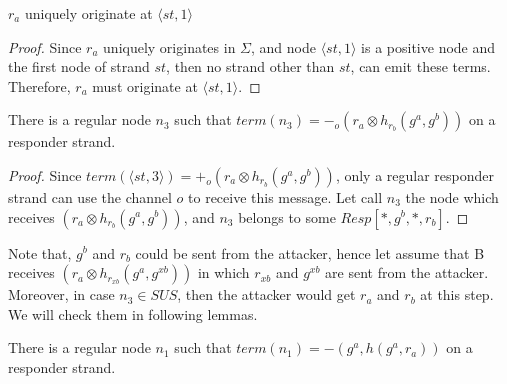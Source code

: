 \begin{Lemma}\label{lemme4.2}
$r_a$ uniquely originate at $\langle st,1 \rangle$ 
\end{Lemma}

\begin{proof}
Since $r_a$ uniquely originates in $\Sigma$, and node $\langle st,1 \rangle$ is a positive node and the first node of strand $st$, then no strand other than $st$, can emit these terms. Therefore, $r_a$ must originate at $\langle st,1 \rangle$.
\end{proof}

\begin{Lemma}\label{lemme4.3}
There is a regular node $n_3$ such that $term(n_3)= -_o(r_a \otimes h_{r_b}(g^a,g^b))$ on a responder strand. 
\end{Lemma}

\begin{proof}
Since $term(\langle st,3 \rangle) = +_o(r_a \otimes h_{r_b}(g^a,g^b))$, only a regular responder strand can use the channel $o$ to receive this message. Let call $n_3$ the node which receives $(r_a \otimes h_{r_b}(g^a,g^b))$, and $n_3$ belongs to some $Resp[*,g^b,*,r_b]$.
\end{proof}

Note that, $g^b$ and $r_b$ could be sent from the attacker, hence let assume that B receives $(r_a \otimes h_{r_{xb}}(g^a,g^{xb}))$ in which $r_{xb}$ and $g^{xb}$ are sent from the attacker. Moreover, in case $n_3 \in SUS$, then the attacker would get $r_a$ and $r_b$ at this step. We will check them in following lemmas. 

\begin{Lemma}\label{lemme4.4}
There is a regular node $n_1$ such that $term(n_1)= -(g^a,h(g^a,r_a))$ on a responder strand. 
\end{Lemma}

